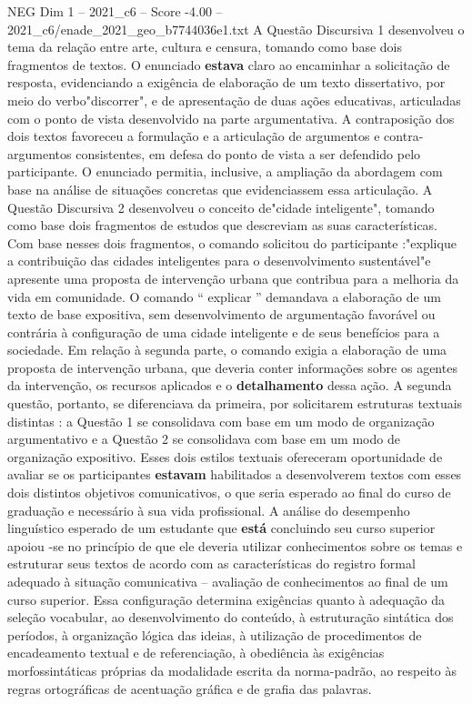 \begin{textsample}{NEG Dim 1 – 2021\_c6 – Score -4.00 – 2021\_c6/enade\_2021\_geo\_b7744036e1.txt}
A Questão Discursiva 1 desenvolveu o tema da relação entre arte, cultura e censura, tomando como base dois fragmentos de textos.
O enunciado \textbf{estava} claro ao encaminhar a solicitação de resposta, evidenciando a exigência de elaboração de um texto dissertativo, por meio do verbo"discorrer", e de apresentação de duas ações educativas, articuladas com o ponto de vista desenvolvido na parte argumentativa.
A contraposição dos dois textos favoreceu a formulação e a articulação de argumentos e contra-argumentos consistentes, em defesa do ponto de vista a ser defendido pelo participante.
O enunciado permitia, inclusive, a ampliação da abordagem com base na análise de situações concretas que evidenciassem essa articulação.
A Questão Discursiva 2 desenvolveu o conceito de"cidade inteligente", tomando como base dois fragmentos de estudos que descreviam as suas características.
Com base nesses dois fragmentos, o comando solicitou do participante :"explique a contribuição das cidades inteligentes para o desenvolvimento sustentável"e apresente uma proposta de intervenção urbana que contribua para a melhoria da vida em comunidade.
O comando “ explicar ” demandava a elaboração de um texto de base expositiva, sem desenvolvimento de argumentação favorável ou contrária à configuração de uma cidade inteligente e de seus benefícios para a sociedade.
Em relação à segunda parte, o comando exigia a elaboração de uma proposta de intervenção urbana, que deveria conter informações sobre os agentes da intervenção, os recursos aplicados e o \textbf{detalhamento} dessa ação.
A segunda questão, portanto, se diferenciava da primeira, por solicitarem estruturas textuais distintas : a Questão 1 se consolidava com base em um modo de organização argumentativo e a Questão 2 se consolidava com base em um modo de organização expositivo.
Esses dois estilos textuais ofereceram oportunidade de avaliar se os participantes \textbf{estavam} habilitados a desenvolverem textos com esses dois distintos objetivos comunicativos, o que seria esperado ao final do curso de graduação e necessário à sua vida profissional.
A análise do desempenho linguístico esperado de um estudante que \textbf{está} concluindo seu curso superior apoiou -se no princípio de que ele deveria utilizar conhecimentos sobre os temas e estruturar seus textos de acordo com as características do registro formal adequado à situação comunicativa – avaliação de conhecimentos ao final de um curso superior.
Essa configuração determina exigências quanto à adequação da seleção vocabular, ao desenvolvimento do conteúdo, à estruturação sintática dos períodos, à organização lógica das ideias, à utilização de procedimentos de encadeamento textual e de referenciação, à obediência às exigências morfossintáticas próprias da modalidade escrita da norma-padrão, ao respeito às regras ortográficas de acentuação gráfica e de grafia das palavras.

\end{textsample}
